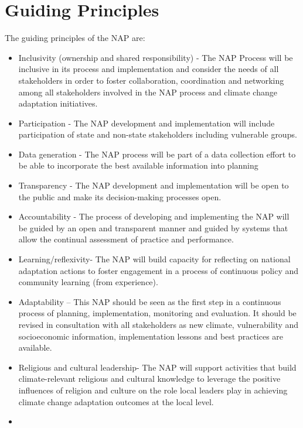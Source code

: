 \documentclass[
]{book}
\begin{document}
\hypertarget{guiding-principles}{%
\section{Guiding Principles}\label{guiding-principles}}

The guiding principles of the NAP are:

\begin{itemize}
\item
  Inclusivity (ownership and shared responsibility) - The NAP Process will be inclusive in its process and implementation and consider the needs of all stakeholders in order to foster collaboration, coordination and networking among all stakeholders involved in the NAP process and climate change adaptation initiatives.
\item
  Participation - The NAP development and implementation will include participation of state and non-state stakeholders including vulnerable groups.
\item
  Data generation - The NAP process will be part of a data collection effort to be able to incorporate the best available information into planning
\item
  Transparency - The NAP development and implementation will be open to the public and make its decision-making processes open.
\item
  Accountability - The process of developing and implementing the NAP will be guided by an open and transparent manner and guided by systems that allow the continual assessment of practice and performance.
\item
  Learning/reflexivity- The NAP will build capacity for reflecting on national adaptation actions to foster engagement in a process of continuous policy and community learning (from experience).
\item
  Adaptability -- This NAP should be seen as the first step in a continuous process of planning, implementation, monitoring and evaluation. It should be revised in consultation with all stakeholders as new climate, vulnerability and socioeconomic information, implementation lessons and best practices are available.\\
\item
  Religious and cultural leadership- The NAP will support activities that build climate-relevant religious and cultural knowledge to leverage the positive influences of religion and culture on the role local leaders play in achieving climate change adaptation outcomes at the local level.
\item

\end{itemize}
\end{document}
